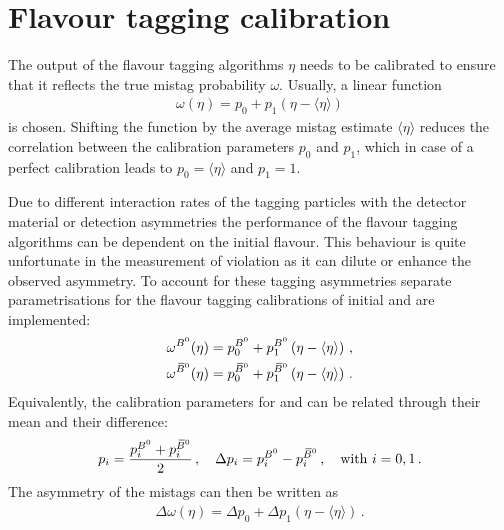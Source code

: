 
\section{Flavour tagging calibration}
\label{sec:dataanalysis:taggingcalibration}

The output of the flavour tagging algorithms $\eta$ needs to be calibrated to
ensure that it reflects the true mistag probability $\omega$. Usually, a
linear function
\begin{align}
	\omega(\eta) = p_0 + p_1 (\eta - \langle\eta\rangle)
\label{eq:dataanalysis:taggingcalibration:generalfunction}
\end{align}
is chosen. Shifting the function by the average mistag estimate
$\langle\eta\rangle$ reduces the correlation between the calibration
parameters $p_0$ and $p_1$, which in case of a perfect calibration leads to
$p_0 = \langle\eta\rangle$ and $p_1 = 1$.

Due to different interaction rates of the tagging particles with the detector
material or detection asymmetries the performance of the flavour tagging
algorithms can be dependent on the initial flavour. This behaviour is quite
unfortunate in the measurement of \CP violation as it can dilute or enhance
the observed asymmetry. To account for these tagging asymmetries separate
parametrisations for the flavour tagging calibrations of initial \Bd and \Bzb
are implemented:
\begin{equation}
\begin{split}
  \omega^{{{B}^0} }(\eta) = p_0^{{{B}^0} } + p_1^{{{B}^0} }\left(\eta - \langle\eta\rangle\right) \, , \\
  \omega^{{{\kern 0.18em\overline{\kern -0.18em B}{}}{}^0}}(\eta) = p_0^{{{\kern 0.18em\overline{\kern -0.18em B}{}}{}^0}} + p_1^{{{\kern 0.18em\overline{\kern -0.18em B}{}}{}^0}}\left(\eta - \langle\eta\rangle\right) \, .
\end{split}
\label{eq:dataanalysis:taggingcalibration:individual_parametrisations}
\end{equation}
Equivalently, the calibration parameters for \Bd and \Bzb can be related
through their mean and their difference:
\begin{equation}
  p_i        = \frac{p_i^{{{B}^0} } + p_i^{{{\kern 0.18em\overline{\kern -0.18em B}{}}{}^0}}}{2} \, , \quad
  \Delta p_i = p_i^{{{B}^0} } - p_i^{{{\kern 0.18em\overline{\kern -0.18em B}{}}{}^0}} \, , \quad
  \text{with }i = 0,1 \,.
\label{eq:dataanalysis:taggingcalibration:individual_pis}
\end{equation}
The asymmetry of the mistags can then be written as
\begin{align}
	\Delta\omega(\eta) = \Delta p_0 + \Delta p_1 (\eta - \langle\eta\rangle)\,.
\label{eq:dataanalysis:taggingcalibration:mistagasymmetry}
\end{align}

